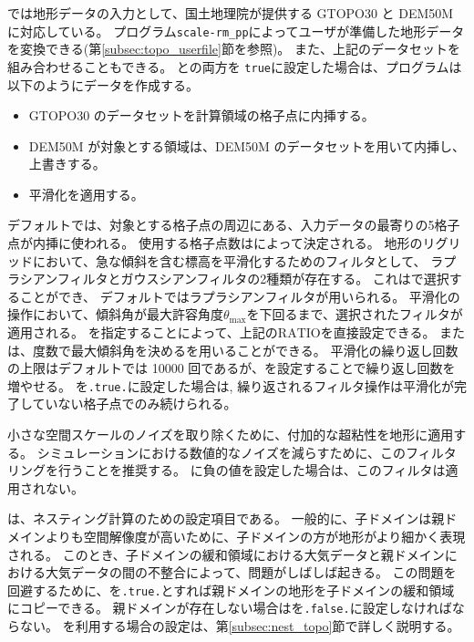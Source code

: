 \scalerm では地形データの入力として、国土地理院が提供する
GTOPO30 と DEM50M に対応している。
プログラム\verb|scale-rm_pp|によってユーザが準備した地形データを変換できる(第\ref{subsec:topo_userfile}節を参照)。
また、上記のデータセットを組み合わせることもできる。
との両方を
\verb|true|に設定した場合は、プログラムは以下のようにデータを作成する。

\begin{itemize}
 \item GTOPO30 のデータセットを計算領域の格子点に内挿する。
 \item DEM50M が対象とする領域は、DEM50M のデータセットを用いて内挿し、上書きする。
 \item 平滑化を適用する。
\end{itemize}

デフォルトでは、対象とする格子点の周辺にある、入力データの最寄りの5格子点が内挿に使われる。
使用する格子点数はによって決定される。
地形のリグリッドにおいて、急な傾斜を含む標高を平滑化するためのフィルタとして、
ラプラシアンフィルタとガウスシアンフィルタの2種類が存在する。
これはで選択することができ、
デフォルトではラプラシアンフィルタが用いられる。
平滑化の操作において、傾斜角が最大許容角度$\theta_{\max}$を下回るまで、選択されたフィルタが適用される。
を指定することによって、上記の$\mathrm{RATIO}$を直接設定できる。
または、度数で最大傾斜角を決めるを用いることができる。
平滑化の繰り返し回数の上限はデフォルトでは 10000 回であるが、を設定することで繰り返し回数を増やせる。
を\verb|.true.|に設定した場合は, 繰り返されるフィルタ操作は平滑化が完了していない格子点でのみ続けられる。

小さな空間スケールのノイズを取り除くために、付加的な超粘性を地形に適用する。
シミュレーションにおける数値的なノイズを減らすために、このフィルタリングを行うことを推奨する。
に負の値を設定した場合は、このフィルタは適用されない。

は、ネスティング計算のための設定項目である。
一般的に、子ドメインは親ドメインよりも空間解像度が高いために、子ドメインの方が地形がより細かく表現される。
このとき、子ドメインの緩和領域における大気データと親ドメインにおける大気データの間の不整合によって、問題がしばしば起きる。
この問題を回避するために、を\verb|.true.|とすれば親ドメインの地形を子ドメインの緩和領域にコピーできる。
親ドメインが存在しない場合はを\verb|.false.|に設定しなければならない。
を利用する場合の設定は、第\ref{subsec:nest_topo}節で詳しく説明する。


